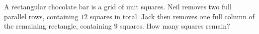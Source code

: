 A rectangular chocolate bar is a grid of unit squares. Neil removes two full parallel rows, containing $12$ squares in total. Jack then removes one full column of the remaining rectangle, containing $9$ squares. How many squares remain?
